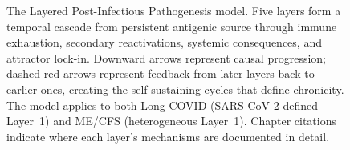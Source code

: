 \begin{figure}[htbp]
\caption{The Layered Post-Infectious Pathogenesis model. Five layers form a temporal cascade from persistent antigenic source through immune exhaustion, secondary reactivations, systemic consequences, and attractor lock-in. Downward arrows represent causal progression; dashed red arrows represent feedback from later layers back to earlier ones, creating the self-sustaining cycles that define chronicity. The model applies to both Long COVID (SARS-CoV-2-defined Layer~1) and ME/CFS (heterogeneous Layer~1). Chapter citations indicate where each layer's mechanisms are documented in detail.}
\label{fig:layered-pathogenesis}
\end{figure}
